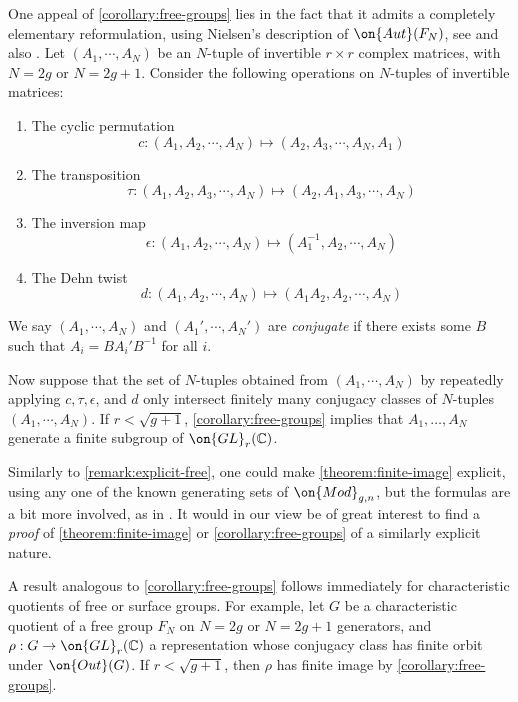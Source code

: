 \begin{remark}
\notready
	\label{remark:explicit-free}
One appeal of \autoref{corollary:free-groups} lies in the fact that it admits a completely elementary reformulation, using Nielsen's description of $\on{Aut}(F_N)$,
see \cite{nielsen:die-isomorphismengruppe}
and also \cite[Theorem 3.2, p. 131]{magnusKS:combinatorial-group-theory}.
Let $(A_1, \cdots, A_N)$ be an $N$-tuple of invertible $r\times r$ complex matrices, with $N=2g$ or $N=2g+1$. Consider the following operations on $N$-tuples of invertible matrices:
\begin{enumerate}
	\item The cyclic permutation $$c: (A_1, A_2, \cdots, A_N)\mapsto (A_2, A_3, \cdots, A_N, A_1)$$
	\item The transposition $$\tau: (A_1, A_2, A_3, \cdots, A_N)\mapsto (A_2, A_1, A_3, \cdots, A_N)$$
	\item The inversion map  $$\epsilon: (A_1, A_2, \cdots, A_N)\mapsto (A_1^{-1},A_2, \cdots, A_N)$$
	\item The Dehn twist $$d: (A_1, A_2, \cdots, A_N)\mapsto (A_1A_2, A_2, \cdots, A_N)$$
\end{enumerate}
	We say $(A_1, \cdots, A_N)$ and $(A_1', \cdots, A_N')$ are \emph{conjugate} if there exists some $B$ such that $A_i=BA_i'B^{-1}$ for all $i$.

	Now suppose that the set of $N$-tuples obtained from $(A_1, \cdots, A_N)$ by repeatedly applying $c, \tau, \epsilon$, and $d$ only intersect finitely many conjugacy classes of $N$-tuples
	$(A_1, \cdots, A_N)$.
	If $r<\sqrt{g+1}$,
	\autoref{corollary:free-groups} implies that $A_1, \ldots, A_N$ generate a finite subgroup of $\on{GL}_r(\mathbb{C})$.
\end{remark}
\begin{remark}
\notready
	\label{remark:}
	Similarly to \autoref{remark:explicit-free}, one could make
	\autoref{theorem:finite-image} explicit, using any one of the known
	generating sets of $\on{Mod}_{g,n}$, but the formulas are a bit more
	involved, as in \cite[\S6]{CH:isomonodromic}. It would in our view be of great interest to find a \emph{proof} of \autoref{theorem:finite-image} or \autoref{corollary:free-groups} of a similarly explicit nature.
\end{remark}

\begin{remark}
\notready
A result analogous to \autoref{corollary:free-groups} follows immediately for
characteristic quotients of free or surface groups. For example, let $G$ be a
characteristic quotient of a free group $F_N$ on $N=2g$ or $N=2g+1$ generators,
and $\rho: G\to \on{GL}_r(\mathbb{C})$ a representation whose conjugacy class has finite orbit under $\on{Out}(G)$. If $r<\sqrt{g+1}$, then $\rho$ has finite image by \autoref{corollary:free-groups}.
\end{remark}



